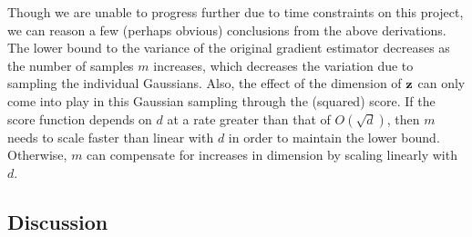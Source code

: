 \documentclass[10pt]{article}
\begin{document}
Though we are unable to progress further due to time constraints on this project, we can reason a few (perhaps obvious) conclusions from the above derivations. The lower bound to the variance of the original gradient estimator decreases as the number of samples $m$ increases, which decreases the variation due to sampling the individual Gaussians. Also, the effect of the dimension of $\mathbf{z}$ can only come into play in this Gaussian sampling through the (squared) score. If the score function depends on $d$ at a rate greater than that of $O(\sqrt{d})$, then $m$ needs to scale faster than linear with $d$ in order to maintain the lower bound. Otherwise, $m$ can compensate for increases in dimension by scaling linearly with $d$.


\subsection{Discussion} \label{sec:discussion}


\newpage




\end{document}
